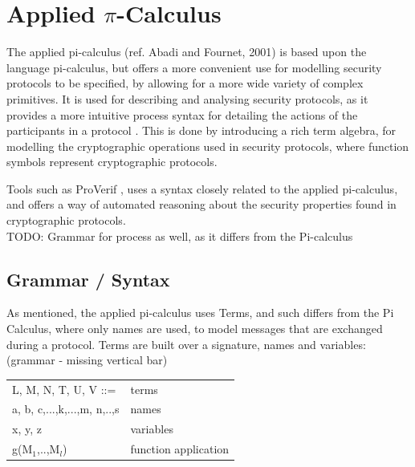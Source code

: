 \section{Applied $\pi$-Calculus}

The applied pi-calculus (ref. Abadi and Fournet, 2001) is based upon the language pi-calculus, but offers a more convenient use for modelling security protocols to be specified, by allowing for a more wide variety of complex primitives. It is used for describing and analysing security protocols, as it provides a more intuitive process syntax for detailing the actions of the participants in a protocol \autocite{AplliedPiCalsulus2010}. This is done by introducing a rich term algebra, for modelling the cryptographic operations used in security protocols, where function symbols represent cryptographic protocols. 

Tools such as ProVerif \autocite{ProVerif}, uses a syntax closely related to the applied pi-calculus, and offers a way of automated reasoning about the security properties found in cryptographic protocols. \\

TODO: Grammar for process as well, as it differs from the Pi-calculus

\subsection{Grammar / Syntax}
As mentioned, the applied pi-calculus uses Terms, and such differs from the Pi Calculus, where only names are used, to model messages that are exchanged during a protocol. Terms are built over a signature, names and variables\autocite{AplliedPiCalsulus2010}: (grammar - missing vertical bar)\\
\begin{center}
	\begin{tabular} { l l }
 		L, M, N, T, U, V ::= & terms \\ 
 		a, b, c,...,k,...,m, n,..,s & names \\  
 		x, y, z & variables \\
 		g(M$_{1}$,..,M$_{l}$) & function application
	\end{tabular}
\end{center}

